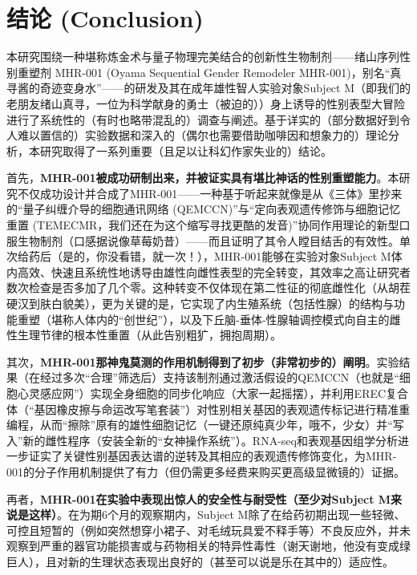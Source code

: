 
\section{结论 (Conclusion)}

本研究围绕一种堪称炼金术与量子物理完美结合的创新性生物制剂——绪山序列性别重塑剂 MHR-001 (Oyama Sequential Gender Remodeler MHR-001)，别名“真寻酱的奇迹变身水”——的研发及其在成年雄性智人实验对象Subject M（即我们的老朋友绪山真寻，一位为科学献身的勇士（被迫的））身上诱导的性别表型大冒险进行了系统性的（有时也略带混乱的）调查与阐述。基于详实的（部分数据好到令人难以置信的）实验数据和深入的（偶尔也需要借助咖啡因和想象力的）理论分析，本研究取得了一系列重要（且足以让科幻作家失业的）结论。

首先，\textbf{MHR-001被成功研制出来，并被证实具有堪比神话的性别重塑能力}。本研究不仅成功设计并合成了MHR-001——一种基于听起来就像是从《三体》里抄来的“量子纠缠介导的细胞通讯网络 (QEMCCN)”与“定向表观遗传修饰与细胞记忆重置 (TEMECMR，我们还在为这个缩写寻找更酷的发音)”协同作用理论的新型口服生物制剂（口感据说像草莓奶昔）——而且证明了其令人瞠目结舌的有效性。单次给药后（是的，你没看错，就一次！），MHR-001能够在实验对象Subject M体内高效、快速且系统性地诱导由雄性向雌性表型的完全转变，其效率之高让研究者数次检查是否多加了几个零。这种转变不仅体现在第二性征的彻底雌性化（从胡茬硬汉到肤白貌美），更为关键的是，它实现了内生殖系统（包括性腺）的结构与功能重塑（堪称人体内的“创世纪”），以及下丘脑-垂体-性腺轴调控模式向自主的雌性生理节律的根本性重置（从此告别粗犷，拥抱周期）。

其次，\textbf{MHR-001那神鬼莫测的作用机制得到了初步（非常初步的）阐明}。实验结果（在经过多次“合理”筛选后）支持该制剂通过激活假设的QEMCCN（也就是“细胞心灵感应网”）实现全身细胞的同步化响应（大家一起摇摆），并利用EREC复合体（“基因橡皮擦与命运改写笔套装”）对性别相关基因的表观遗传标记进行精准重编程，从而“擦除”原有的雄性细胞记忆（一键还原纯真少年，哦不，少女）并“写入”新的雌性程序（安装全新的“女神操作系统”）。RNA-seq和表观基因组学分析进一步证实了关键性别基因表达谱的逆转及其相应的表观遗传修饰变化，为MHR-001的分子作用机制提供了有力（但仍需更多经费来购买更高级显微镜的）证据。

再者，\textbf{MHR-001在实验中表现出惊人的安全性与耐受性（至少对Subject M来说是这样）}。在为期6个月的观察期内，Subject M除了在给药初期出现一些轻微、可控且短暂的（例如突然想穿小裙子、对毛绒玩具爱不释手等）不良反应外，并未观察到严重的器官功能损害或与药物相关的特异性毒性（谢天谢地，他没有变成绿巨人），且对新的生理状态表现出良好的（甚至可以说是乐在其中的）适应性。

